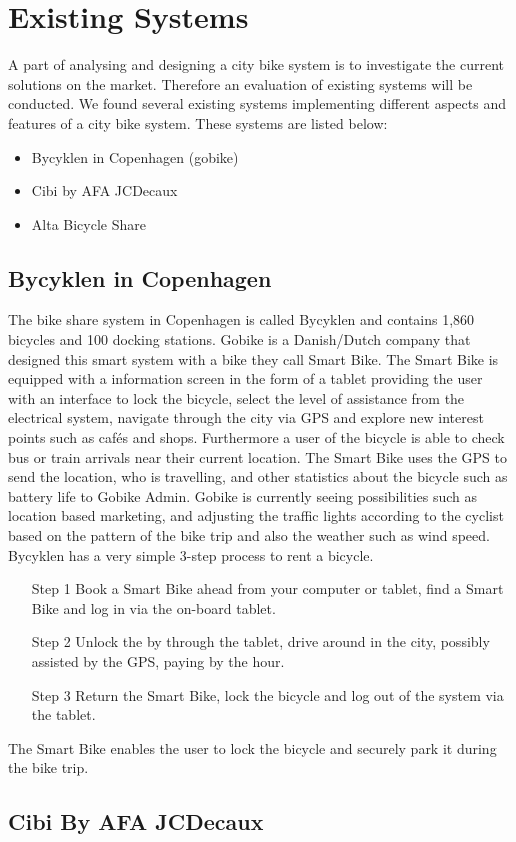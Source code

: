 \section{Existing Systems}
A part of analysing and designing a city bike system is to investigate the current solutions on the market. 
Therefore an evaluation of existing systems will be conducted.
We found several existing systems implementing different aspects and features of a city bike system. 
These systems are listed below:
\begin{itemize}
\item Bycyklen in Copenhagen (gobike)
\item Cibi by AFA JCDecaux
\item Alta Bicycle Share
\end{itemize}
\subsection{Bycyklen in Copenhagen}
The bike share system in Copenhagen is called Bycyklen and contains 1,860 bicycles and 100 docking stations. 
Gobike is a Danish/Dutch company that designed this smart system with a bike they call Smart Bike. 
The Smart Bike is equipped with a information screen in the form of a tablet providing the user with an interface to lock the bicycle, select the level of assistance from the electrical system, navigate through the city via GPS and explore new interest points such as cafés and shops.
Furthermore a user of the bicycle is able to check bus or train arrivals near their current location.
The Smart Bike uses the GPS to send the location, who is travelling, and other statistics about the bicycle such as battery life to Gobike Admin.
Gobike is currently seeing possibilities such as location based marketing, and adjusting the traffic lights according to the cyclist based on the pattern of the bike trip and also the weather such as wind speed.
Bycyklen has a very simple 3-step process to rent a bicycle.
\begin{itemize}
\item[Step 1] Book a Smart Bike ahead from your computer or tablet, find a Smart Bike and log in via the on-board tablet.
\item[Step 2] Unlock the by through the tablet, drive around in the city, possibly assisted by the GPS, paying by the hour.
\item[Step 3] Return the Smart Bike, lock the bicycle and log out of the system via the tablet.
\end{itemize}
The Smart Bike enables the user to lock the bicycle and securely park it during the bike trip.

\subsection{Cibi By AFA JCDecaux}
